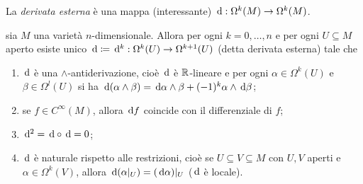 La \emph{derivata esterna} è una mappa (interessante) $\,\mathrm d:\Omega^k(M) \to \Omega^k(M)$. %

\begin{theorem}
	sia $M$ una varietà $n$-dimensionale. Allora per ogni $k=0,\ldots,n$ e per ogni $U\subseteq M$ aperto esiste unico $\,\mathrm d \coloneqq \,\mathrm d^k : \Omega^k(U) \to \Omega^{k+1}(U)$ (detta derivata esterna) tale che
	\begin{enumerate}
		\item $\,\mathrm d$ è una $\wedge$-antiderivazione, cioè $\,\mathrm d$ è $\mathbb R$-lineare e per ogni $\alpha\in\Omega^k(U)$ e $\beta\in\Omega^l(U)$ si ha $\,\mathrm d(\alpha\wedge\beta) = \,\mathrm d\alpha \wedge \beta +(-1)^k \alpha\wedge \,\mathrm d \beta$;
		\item se $f\in C^\infty(M)$, allora $\,\mathrm d f$ coincide con il differenziale di $f$;
		\item $\,\mathrm d^2 = \,\mathrm d\circ \,\mathrm d = 0$;
		\item $\,\mathrm d$ è naturale rispetto alle restrizioni, cioè se $U\subseteq V \subseteq M$ con $U,V$ aperti e $\alpha\in\Omega^k(V)$, allora $\,\mathrm d(\alpha|_ U) = (\,\mathrm d\alpha)|_ U$ ($\,\mathrm d$ è locale).
	\end{enumerate}
\end{theorem}
